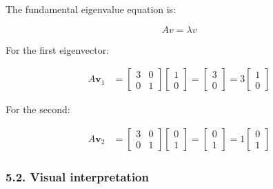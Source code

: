 \documentclass[11pt]{article}
\begin{document}
The fundamental eigenvalue equation is:

\[
Av=\lambda v
\]

For the first eigenvector:

\[
\begin{aligned}
A\mathbf{v}_1
&=\begin{bmatrix}3&0\\0&1\end{bmatrix}
\begin{bmatrix}1\\0\end{bmatrix}
=\begin{bmatrix}3\\0\end{bmatrix}
=3\begin{bmatrix}1\\0\end{bmatrix}
\end{aligned}
\]

For the second:

\[
\begin{aligned}
A\mathbf{v}_2
&=\begin{bmatrix}3&0\\0&1\end{bmatrix}
\begin{bmatrix}0\\1\end{bmatrix}
=\begin{bmatrix}0\\1\end{bmatrix}
=1\begin{bmatrix}0\\1\end{bmatrix}
\end{aligned}
\]

\subsubsection{5.2. Visual interpretation}\label{visual-interpretation}
\end{document}
